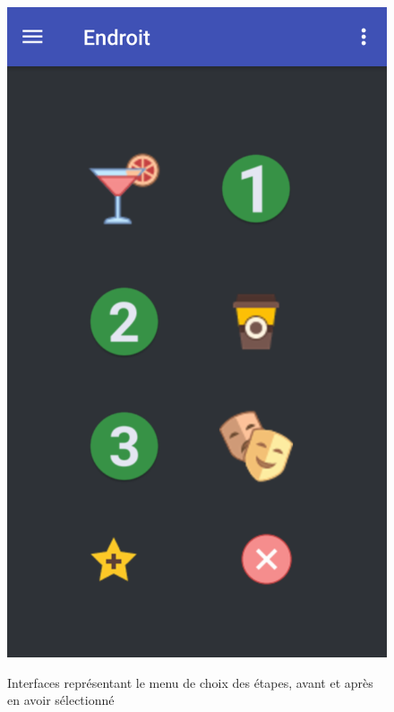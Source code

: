 \documentclass[a4paper, 12pt, notitlepage]{article} %
\begin{document}
\begin{figure}[!htb]
    {\label{interface:etapeSelect}\includegraphics[height=0.4\textheight]{Interface_Etape_Selection.png}}
    \caption[]{Interfaces représentant le menu de choix des étapes, avant et après en avoir sélectionné}
    \label{interface:ChangeEtapes}
\end{figure}
\vfill
\end{document}
